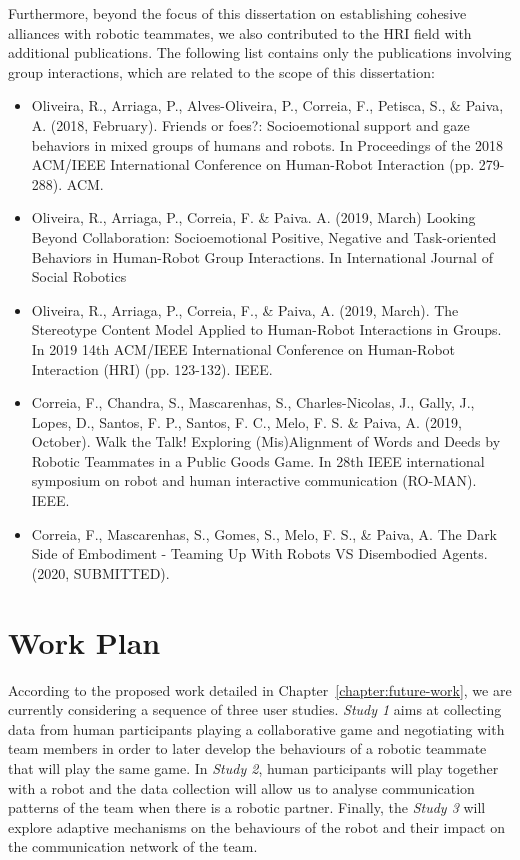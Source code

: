 Furthermore, beyond the focus of this dissertation on establishing cohesive alliances with robotic teammates, we also contributed to the HRI field with additional publications. The following list contains only the publications involving group interactions, which are related to the scope of this dissertation:
\begin{itemize}
    \item Oliveira, R., Arriaga, P., Alves-Oliveira, P., Correia, F., Petisca, S., \& Paiva, A. (2018, February). Friends or foes?: Socioemotional support and gaze behaviors in mixed groups of humans and robots. In Proceedings of the 2018 ACM/IEEE International Conference on Human-Robot Interaction (pp. 279-288). ACM.
    \item Oliveira, R., Arriaga, P., Correia, F. \& Paiva. A. (2019, March) Looking Beyond Collaboration: Socioemotional Positive, Negative and Task-oriented Behaviors in Human-Robot Group Interactions. In International Journal of Social Robotics
    \item Oliveira, R., Arriaga, P., Correia, F., \& Paiva, A. (2019, March). The Stereotype Content Model Applied to Human-Robot Interactions in Groups. In 2019 14th ACM/IEEE International Conference on Human-Robot Interaction (HRI) (pp. 123-132). IEEE.
    \item Correia, F., Chandra, S., Mascarenhas, S., Charles-Nicolas, J., Gally, J., Lopes, D., Santos, F. P., Santos, F. C., Melo, F. S. \& Paiva, A. (2019, October). Walk the Talk! Exploring (Mis)Alignment of Words and Deeds by Robotic Teammates in a Public Goods Game. In 28th IEEE international symposium on robot and human interactive communication (RO-MAN). IEEE.
    \item Correia, F., Mascarenhas, S., Gomes, S., Melo, F. S., \& Paiva, A. The Dark Side of Embodiment - Teaming Up With Robots VS Disembodied Agents. (2020, SUBMITTED).
\end{itemize}


\section{Work Plan}
According to the proposed work detailed in Chapter~\ref{chapter:future-work}, we are currently considering a sequence of three user studies. \textit{Study 1} aims at collecting data from human participants playing a collaborative game and negotiating with team members in order to later develop the behaviours of a robotic teammate that will play the same game. In \textit{Study 2}, human participants will play together with a robot and the data collection will allow us to analyse communication patterns of the team when there is a robotic partner. Finally, the \textit{Study 3} will explore adaptive mechanisms on the behaviours of the robot and their impact on the communication network of the team.


